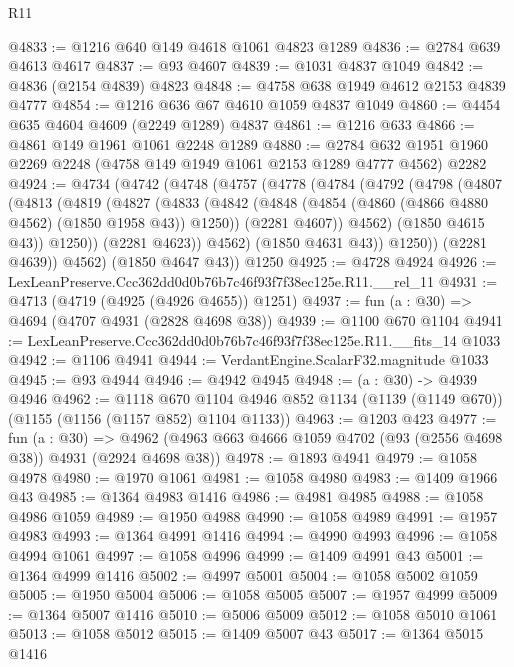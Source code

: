 \begin{lexlean}{R11}
\begin{coremodule}
@4833 := @1216 @640 @149 @4618 @1061 @4823 @1289
@4836 := @2784 @639 @4613 @4617
@4837 := @93 @4607
@4839 := @1031 @4837 @1049
@4842 := @4836 (@2154 @4839) @4823
@4848 := @4758 @638 @1949 @4612 @2153 @4839 @4777
@4854 := @1216 @636 @67 @4610 @1059 @4837 @1049
@4860 := @4454 @635 @4604 @4609 (@2249 @1289) @4837
@4861 := @1216 @633
@4866 := @4861 @149 @1961 @1061 @2248 @1289
@4880 := @2784 @632 @1951 @1960 @2269 @2248 (@4758 @149 @1949 @1061 @2153 @1289 @4777 @4562) @2282
@4924 := @4734
    (@4742
      (@4748
        (@4757
          (@4778
            (@4784
              (@4792
                (@4798
                  (@4807
                    (@4813
                      (@4819
                        (@4827
                          (@4833
                            (@4842
                              (@4848 (@4854 (@4860 (@4866 @4880 @4562) (@1850 @1958 @43)) @1250))
                              (@2281 @4607))
                            @4562)
                          (@1850 @4615 @43))
                        @1250))
                    (@2281 @4623))
                  @4562)
                (@1850 @4631 @43))
              @1250))
          (@2281 @4639))
        @4562)
      (@1850 @4647 @43))
    @1250
@4925 := @4728 @4924
@4926 := LexLeanPreserve.Ccc362dd0d0b76b7c46f93f7f38ec125e.R11.__rel_11
@4931 := @4713 (@4719 (@4925 (@4926 @4655)) @1251)
@4937 := fun (a : @30) => @4694 (@4707 @4931 (@2828 @4698 @38))
@4939 := @1100 @670 @1104
@4941 := LexLeanPreserve.Ccc362dd0d0b76b7c46f93f7f38ec125e.R11.__fits_14 @1033
@4942 := @1106 @4941
@4944 := VerdantEngine.ScalarF32.magnitude @1033
@4945 := @93 @4944
@4946 := @4942 @4945
@4948 := (a : @30) -> @4939 @4946
@4962 := @1118
    @670
    @1104
    @4946
    @852
    @1134
    (@1139 (@1149 @670))
    (@1155 (@1156 (@1157 @852) @1104 @1133))
@4963 := @1203 @423
@4977 := fun (a : @30) =>
  @4962 (@4963 @663 @4666 @1059 @4702 (@93 (@2556 @4698 @38)) @4931 (@2924 @4698 @38))
@4978 := @1893 @4941
@4979 := @1058 @4978
@4980 := @1970 @1061
@4981 := @1058 @4980
@4983 := @1409 @1966 @43
@4985 := @1364 @4983 @1416
@4986 := @4981 @4985
@4988 := @1058 @4986 @1059
@4989 := @1950 @4988
@4990 := @1058 @4989
@4991 := @1957 @4983
@4993 := @1364 @4991 @1416
@4994 := @4990 @4993
@4996 := @1058 @4994 @1061
@4997 := @1058 @4996
@4999 := @1409 @4991 @43
@5001 := @1364 @4999 @1416
@5002 := @4997 @5001
@5004 := @1058 @5002 @1059
@5005 := @1950 @5004
@5006 := @1058 @5005
@5007 := @1957 @4999
@5009 := @1364 @5007 @1416
@5010 := @5006 @5009
@5012 := @1058 @5010 @1061
@5013 := @1058 @5012
@5015 := @1409 @5007 @43
@5017 := @1364 @5015 @1416

\end{coremodule}
\end{lexlean}
